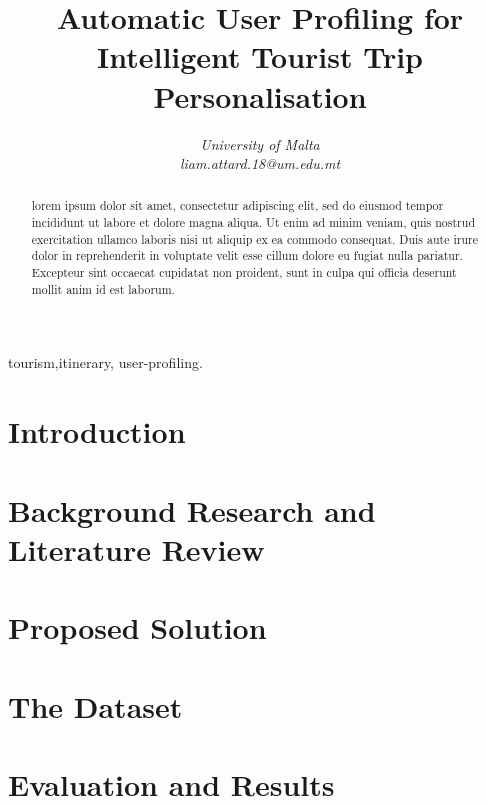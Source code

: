 \documentclass[conference]{IEEEtran}
\title{Automatic User Profiling for Intelligent Tourist Trip Personalisation}
\author{\IEEEauthorblockN{Liam Attard [0299300L] }
\IEEEauthorblockA{Department of Artificial Intelligence}
\textit{University of Malta}\\
\textit{liam.attard.18@um.edu.mt}}
\begin{document}
  \maketitle

  \begin{abstract}
    lorem ipsum dolor sit amet, consectetur adipiscing elit, sed do
    eiusmod tempor incididunt ut labore et dolore magna aliqua. Ut
    enim ad minim veniam, quis nostrud exercitation ullamco laboris
    nisi ut aliquip ex ea commodo consequat. Duis aute irure dolor in
    reprehenderit in voluptate velit esse cillum dolore eu fugiat
    nulla pariatur. Excepteur sint occaecat cupidatat non proident,
    sunt in culpa qui officia deserunt mollit anim id est laborum.
  \end{abstract}

  \begin{IEEEkeywords}
  tourism,itinerary, user-profiling.
  \end{IEEEkeywords}

  \section{Introduction}
    

  \section{Background Research and Literature Review}
    

  \section{Proposed Solution}
    \label{Proposed}
    

  \section{The Dataset}
    \label{Dataset}
    

  \section{Evaluation and Results}
  \label{Evaluation}
    

  
  
\end{document}
